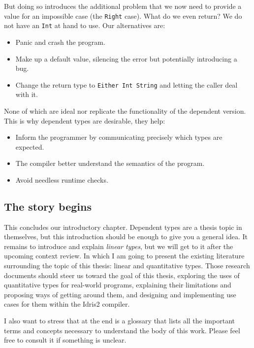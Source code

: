 \documentclass[
]{article}
\providecommand{\tightlist}{%
  \setlength{\itemsep}{0pt}\setlength{\parskip}{0pt}}
\begin{document}
But doing so introduces the additional problem that we now need to
provide a value for an impossible case (the \texttt{Right} case). What
do we even return? We do not have an \texttt{Int} at hand to use. Our
alternatives are:

\begin{itemize}
\tightlist
\item
  Panic and crash the program.
\item
  Make up a default value, silencing the error but potentially
  introducing a bug.
\item
  Change the return type to \texttt{Either\ Int\ String} and letting the
  caller deal with it.
\end{itemize}

None of which are ideal nor replicate the functionality of the dependent
version. This is why dependent types are desirable, they help:

\begin{itemize}
\tightlist
\item
  Inform the programmer by communicating precisely which types are
  expected.
\item
  The compiler better understand the semantics of the program.
\item
  Avoid needless runtime checks.
\end{itemize}

\hypertarget{the-story-begins}{%
\subsection{The story begins}\label{the-story-begins}}

This concludes our introductory chapter. Dependent types are a thesis
topic in themselves, but this introduction should be enough to give you
a general idea. It remains to introduce and explain \emph{linear types},
but we will get to it after the upcoming context review. In which I am
going to present the existing literature surrounding the topic of this
thesis: linear and quantitative types. Those research documents should
steer us toward the goal of this thesis, exploring the uses of
quantitative types for real-world programs, explaining their limitations
and proposing ways of getting around them, and designing and
implementing use cases for them within the Idris2 compiler.

I also want to stress that at the end is a glossary that lists all the
important terms and concepts necessary to understand the body of this
work. Please feel free to consult it if something is unclear.
\end{document}
